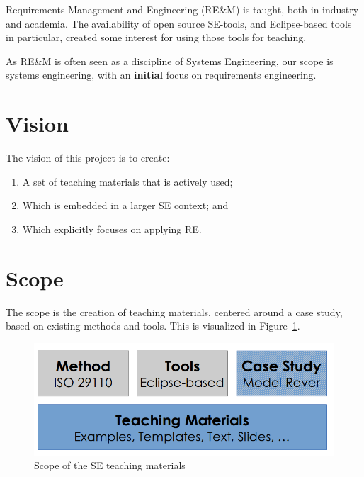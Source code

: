 Requirements Management and Engineering (RE\&M) is taught, both in industry and academia. The availability of open source SE-tools, and Eclipse-based tools in particular, created some interest for using those tools for teaching. 

As RE\&M is often seen as a discipline of Systems Engineering, our scope is systems engineering, with an \textbf{initial} focus on requirements engineering.

\section{Vision}

The vision of this project is to create:

\begin{enumerate}
\item A set of teaching materials that is actively used; 
\item Which is embedded in a larger SE context; and
\item Which explicitly focuses on applying RE. 
\end{enumerate}

\section{Scope}

The scope is the creation of teaching materials, centered around a case study, based on existing methods and tools. This is visualized in Figure~\ref{fig:scope}.

\begin{figure}[h!]
  \centering
  \includegraphics[width=\textwidth]{../se-images/teaching-overview.png}
  \caption{Scope of the SE teaching materials}
  \label{fig:scope}
\end{figure}

